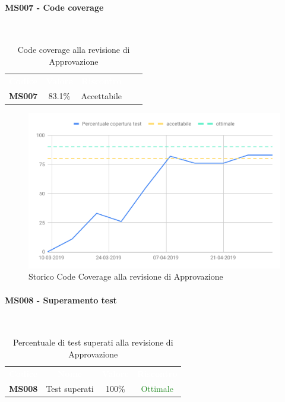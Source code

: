\paragraph{MS007 - Code coverage}\mbox{}\\[0,3cm]
    \begin{table}[H]
        \centering
        \begin{tabular}{ccccc}
            \rowcolor{greySWEight}
            \textcolor{white}{\textbf{Codice}} &
            \textcolor{white}{\textbf{Valore}}&
            \textcolor{white}{\textbf{Riscontro}}\\
            \textbf{MS007} & 83.1\% & \textcolor{YellowOrange}{Accettabile}\\
        \end{tabular}
        \caption{Code coverage alla revisione di Approvazione}
    \end{table}
    \begin{figure}[H]
        \centering
        \includegraphics[width=145mm]{sez/App_Esito/Approvazione/graph/codeCoverage.pdf}
        \caption{Storico Code Coverage alla revisione di Approvazione}
    \end{figure}

\paragraph{MS008 - Superamento test}\mbox{}\\[0,3cm]
    \begin{table}[H]
        \centering
        \begin{tabular}{cccc}
        \rowcolor{greySWEight}
        \textcolor{white}{\textbf{Codice}} &
        \textcolor{white}{\textbf{Nome}} &
        \textcolor{white}{\textbf{Valore}} &
        \textcolor{white}{\textbf{Riscontro}}\\
        \textbf{MS008}& Test superati & 100\% & \textcolor{ForestGreen}{Ottimale} \\

        \end{tabular}
        \caption{Percentuale di test superati alla revisione di Approvazione}
    \end{table}


